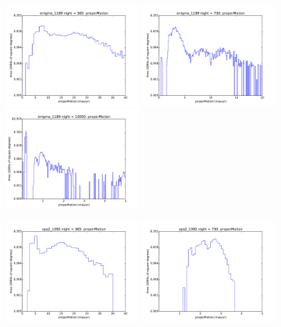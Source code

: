 \begin{figure}[ht]
  \begin{center}
  \includegraphics[width=2.0in]{./figs/milkyway/MW_Astrom_pmError_1189_01y_hst.pdf}
  \includegraphics[width=2.0in]{./figs/milkyway/MW_Astrom_pmError_1189_02y_hst.pdf}
  \includegraphics[width=2.0in]{./figs/milkyway/MW_Astrom_pmError_1189_10y_hst.pdf}
  \end{center}
  \begin{center}
  \includegraphics[width=2.0in]{./figs/milkyway/MW_Astrom_pmError_1092_01y_hst.pdf}
  \includegraphics[width=2.0in]{./figs/milkyway/MW_Astrom_pmError_1092_02y_hst.pdf}

\end{center}
\end{figure}
